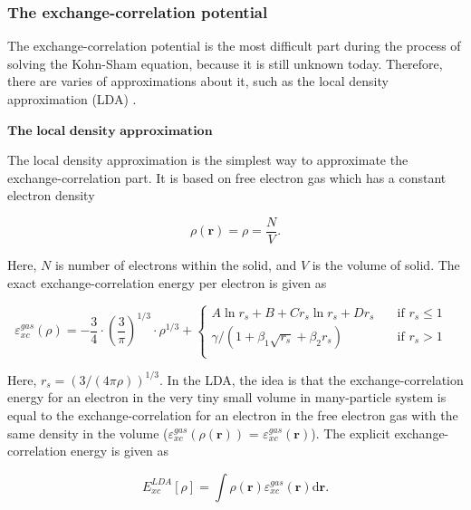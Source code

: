 \documentclass[a4paper, 12pt, titlepage,oneside,drop]{kthesis}
\begin{document}
\subsubsection{The exchange-correlation potential}

The exchange-correlation potential is the most difficult part during the process of solving the Kohn-Sham equation, because it is still unknown today. Therefore, there
 are varies of approximations about it, such as the local density approximation (LDA) \cite{martin2004electronic, Cottenierwien2k, kohn1965self, von1972local, hedin1971explicit}.

$\textbf{The local density approximation}$

The local density approximation is the simplest way to approximate the exchange-correlation part. It is based on free electron gas which has a constant electron density 

\begin{equation}
 \rho(\textbf{r}) = \rho = \frac{N}{V}.
\end{equation}

Here, $N$ is number of electrons within the solid, and $V$ is the volume of solid. The exact exchange-correlation energy per electron is given as

\begin{equation} 
 \varepsilon_{xc}^{gas}(\rho) = -\frac{3}{4}\cdot(\frac{3}{\pi})^{1/3}\cdot{\rho}^{1/3} + 
 \begin{cases} A\ln{r_s}+B+C{r_s}\ln{r_s}+D{r_s} & \quad \mbox{if ${r_s} \leq 1 $} 
\\
 \gamma / (1+\beta_1 \sqrt{{r_s}}+ \beta_2 {r_s}) & \quad \mbox{if ${r_s} > 1$ }\\ 
\end{cases} 
\end{equation}

Here, $r_s = (3 / (4 \pi \rho))^{1/3}$. In the LDA, the idea is that the exchange-correlation energy for an electron in the very tiny small volume in many-particle system is equal to the exchange-correlation for an electron 
in the free electron gas with the same density in the volume ($\varepsilon_{xc}^{gas}(\rho(\textbf{r}))$ = $\varepsilon_{xc}^{gas}(\textbf{r})$). The explicit exchange-correlation energy is given as

\begin{equation}
 E^{LDA}_{xc}[\rho] = \int \rho(\textbf{r}) \varepsilon_{xc}^{gas}( \textbf{r} ) \mathrm{d} \textbf{r}.
\end{equation}
\end{document}
